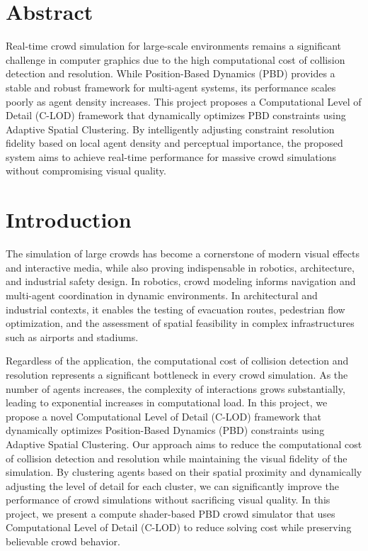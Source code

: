 \section*{Abstract} 
Real-time crowd simulation for large-scale environments remains a significant challenge in computer graphics due to the high computational cost of collision detection and resolution. While Position-Based Dynamics (PBD) provides a stable and robust framework for multi-agent systems, its performance scales poorly as agent density increases. This project proposes a Computational Level of Detail (C-LOD) framework that dynamically optimizes PBD constraints using Adaptive Spatial Clustering. By intelligently adjusting constraint resolution fidelity based on local agent density and perceptual importance, the proposed system aims to achieve real-time performance for massive crowd simulations without compromising visual quality.

\section{Introduction}

The simulation of large crowds has become a cornerstone of modern visual effects and interactive media, while also proving indispensable in robotics, architecture, and industrial safety design. In robotics, crowd modeling informs navigation and multi-agent coordination in dynamic environments. In architectural and industrial contexts, it enables the testing of evacuation routes, pedestrian flow optimization, and the assessment of spatial feasibility in complex infrastructures such as airports and stadiums.  

Regardless of the application, the computational cost of collision detection and resolution represents a significant bottleneck in every crowd simulation. As the number of agents increases, the complexity of interactions grows substantially, leading to exponential increases in computational load. In this project, we propose a novel Computational Level of Detail (C-LOD) framework that dynamically optimizes Position-Based Dynamics (PBD) constraints using Adaptive Spatial Clustering. Our approach aims to reduce the computational cost of collision detection and resolution while maintaining the visual fidelity of the simulation. By clustering agents based on their spatial proximity and dynamically adjusting the level of detail for each cluster, we can significantly improve the performance of crowd simulations without sacrificing visual quality. In this project, we present a compute shader-based PBD crowd simulator that uses Computational Level of Detail (C-LOD) to reduce solving cost while preserving believable crowd behavior.